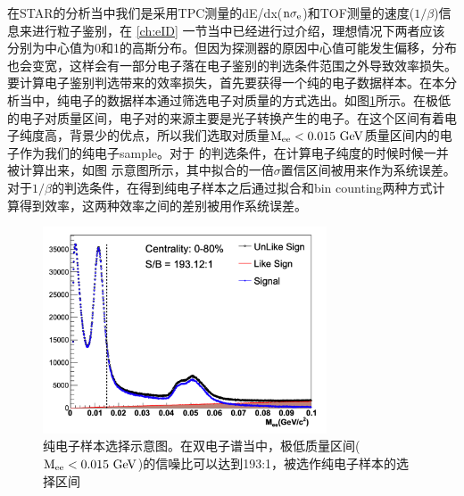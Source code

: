 在STAR的分析当中我们是采用TPC测量的dE/dx(${\rm n\sigma_e}$)和TOF测量的速度($1/\beta$)信息来进行粒子鉴别，在 \ref{ch:eID} 一节当中已经进行过介绍，理想情况下两者应该分别为中心值为0和1的高斯分布。但因为探测器的原因中心值可能发生偏移，分布也会变宽，这样会有一部分电子落在电子鉴别的判选条件范围之外导致效率损失。要计算电子鉴别判选带来的效率损失，首先要获得一个纯的电子数据样本。在本分析当中，纯电子的数据样本通过筛选电子对质量的方式选出。如图\ref{fig:PureElectron}所示。在极低的电子对质量区间，电子对的来源主要是光子转换产生的电子。在这个区间有着电子纯度高，背景少的优点，所以我们选取对质量${\rm M_{ee} < 0.015~GeV}$质量区间内的电子作为我们的纯电子sample。对于 \nSigmaE 的判选条件，在计算电子纯度的时候时候一并被计算出来，如图{\color{red} 示意图}所示，其中拟合的一倍$\sigma$置信区间被用来作为系统误差。对于$1/\beta$的判选条件，在得到纯电子样本之后通过拟合和bin counting两种方式计算得到效率，这两种效率之间的差别被用作系统误差。

\begin{figure}[htb]
    \begin{center}
    \includegraphics[width=0.75\textwidth,clip]{figures/Chapter4/PureElectron.png}
    \end{center}
    \caption[纯电子数据样本选择范围]{纯电子样本选择示意图。在双电子谱当中，极低质量区间(${\rm M_{ee} < 0.015~GeV}$)的信噪比可以达到193:1，被选作纯电子样本的选择区间}
    \label{fig:PureElectron}
\end{figure}

